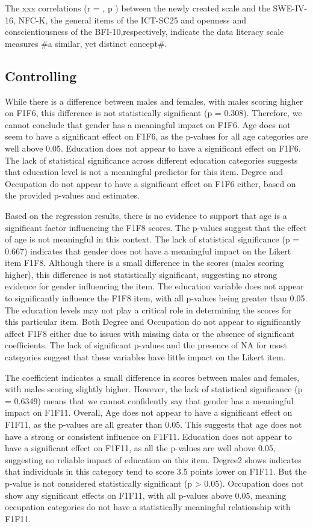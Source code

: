 \documentclass[
  12pt,
  a4paper,
  twoside]{article}
\begin{document}
The xxx correlations (r = , p ) between the newly created scale and the SWE-IV-16, NFC-K, the general items of the ICT-SC25 and openness and conscientiousness of the BFI-10,respectively, indicate the data literacy scale measures \#a similar, yet distinct concept\#.

\subsection{Controlling}\label{controlling}

While there is a difference between males and females, with males scoring higher on F1F6, this difference is not statistically significant (p = 0.308). Therefore, we cannot conclude that gender has a meaningful impact on F1F6. Age does not seem to have a significant effect on F1F6, as the p-values for all age categories are well above 0.05. Education does not appear to have a significant effect on F1F6. The lack of statistical significance across different education categories suggests that education level is not a meaningful predictor for this item. Degree and Occupation do not appear to have a significant effect on F1F6 either, based on the provided p-values and estimates.

Based on the regression results, there is no evidence to support that age is a significant factor influencing the F1F8 scores. The p-values suggest that the effect of age is not meaningful in this context.
The lack of statistical significance (p = 0.667) indicates that gender does not have a meaningful impact on the Likert item F1F8. Although there is a small difference in the scores (males scoring higher), this difference is not statistically significant, suggesting no strong evidence for gender influencing the item.
The education variable does not appear to significantly influence the F1F8 item, with all p-values being greater than 0.05. The education levels may not play a critical role in determining the scores for this particular item.
Both Degree and Occupation do not appear to significantly affect F1F8 either due to issues with missing data or the absence of significant coefficients. The lack of significant p-values and the presence of NA for most categories suggest that these variables have little impact on the Likert item.

The coefficient indicates a small difference in scores between males and females, with males scoring slightly higher. However, the lack of statistical significance (p = 0.6349) means that we cannot confidently say that gender has a meaningful impact on F1F11.
Overall, Age does not appear to have a significant effect on F1F11, as the p-values are all greater than 0.05. This suggests that age does not have a strong or consistent influence on F1F11. Education does not appear to have a significant effect on F1F11, as all the p-values are well above 0.05, suggesting no reliable impact of education on this item.
Degree2 shows indicates that individuals in this category tend to score 3.5 points lower on F1F11. But the p-value is not considered statistically significant (p \textgreater{} 0.05).
Occupation does not show any significant effects on F1F11, with all p-values above 0.05, meaning occupation categories do not have a statistically meaningful relationship with F1F11.
\end{document}
